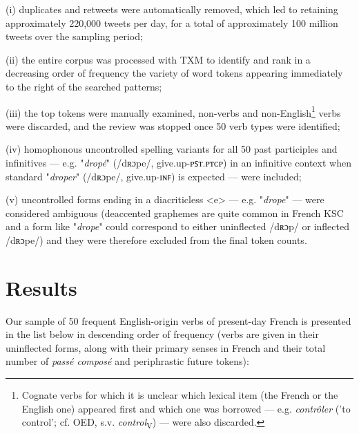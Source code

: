 \documentclass[output=paper]{langscibook}
\begin{document}
(i) duplicates and retweets were automatically removed, which led to retaining approximately 220,000 tweets per day, for a total of approximately 100 million tweets over the sampling period;

(ii) the entire corpus was processed with TXM \citep{Heiden2010} to identify and rank in a decreasing order of frequency the variety of word tokens appearing immediately to the right of the searched patterns;

(iii) the top tokens were manually examined, non-verbs and non-English\footnote{Cognate verbs for which it is unclear which lexical item (the French or the English one) appeared first and which one was borrowed — e.g. \textit{contrôler} ('to control'; cf. OED, s.v. \textit{control}\textsubscript{V}) — were also discarded.} verbs were discarded, and the review was stopped once 50 verb types were identified;

(iv) homophonous uncontrolled spelling variants for all 50 past participles and infinitives — e.g. "\textit{dropé}" (/dʀɔpe/, give.up-ᴘꜱᴛ.ᴘᴛᴄᴘ) in an infinitive context when standard "\textit{droper}" (/dʀɔpe/, give.up-ɪɴꜰ) is expected — were included;

(v) uncontrolled forms ending in a diacriticless <e> — e.g. "\textit{drope}" — were considered ambiguous (deaccented graphemes are quite common in French KSC \citep{Cougnon2010} and a form like "\textit{drope}" could correspond to either uninflected /dʀɔp/ or inflected /dʀɔpe/) and they were therefore excluded from the final token counts.

\section{Results}

Our sample of 50 frequent English-origin verbs of present-day French is presented in the list below in descending order of frequency (verbs are given in their uninflected forms, along with their primary senses in French and their total number of \textit{passé composé} and periphrastic future tokens):
\end{document}

